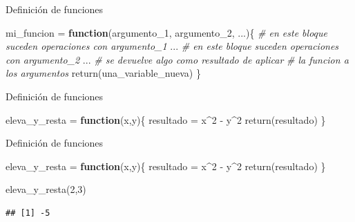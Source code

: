 \documentclass[
  ignorenonframetext,
]{beamer}
\newenvironment{Shaded}{\begin{snugshade}}{\end{snugshade}}
\newcommand{\CommentTok}[1]{\textcolor[rgb]{0.56,0.35,0.01}{\textit{#1}}}
\newcommand{\ControlFlowTok}[1]{\textcolor[rgb]{0.13,0.29,0.53}{\textbf{#1}}}
\newcommand{\DecValTok}[1]{\textcolor[rgb]{0.00,0.00,0.81}{#1}}
\newcommand{\FunctionTok}[1]{\textcolor[rgb]{0.00,0.00,0.00}{#1}}
\newcommand{\NormalTok}[1]{#1}
\newcommand{\OtherTok}[1]{\textcolor[rgb]{0.56,0.35,0.01}{#1}}
\newcommand{\SpecialCharTok}[1]{\textcolor[rgb]{0.00,0.00,0.00}{#1}}
\begin{document}
\begin{frame}[fragile]{Definición de funciones}
\protect\hypertarget{definiciuxf3n-de-funciones}{}
\begin{Shaded}
\begin{Highlighting}[]
\NormalTok{mi\_funcion }\OtherTok{=} \ControlFlowTok{function}\NormalTok{(argumento\_1, argumento\_2, ...)\{}
  \CommentTok{\# en este bloque suceden operaciones con argumento\_1}
\NormalTok{  ...}
  \CommentTok{\# en este bloque suceden operaciones con argumento\_2}
\NormalTok{  ...}
  \CommentTok{\# se devuelve algo como resultado de aplicar}
  \CommentTok{\# la funcion a los argumentos}
  \FunctionTok{return}\NormalTok{(una\_variable\_nueva)}
\NormalTok{\}}
\end{Highlighting}
\end{Shaded}
\end{frame}

\begin{frame}[fragile]{Definición de funciones}
\protect\hypertarget{definiciuxf3n-de-funciones-1}{}
\begin{Shaded}
\begin{Highlighting}[]
\NormalTok{eleva\_y\_resta }\OtherTok{=} \ControlFlowTok{function}\NormalTok{(x,y)\{}
\NormalTok{  resultado }\OtherTok{=}\NormalTok{ x}\SpecialCharTok{\^{}}\DecValTok{2} \SpecialCharTok{{-}}\NormalTok{ y}\SpecialCharTok{\^{}}\DecValTok{2}
  \FunctionTok{return}\NormalTok{(resultado)}
\NormalTok{\}}
\end{Highlighting}
\end{Shaded}
\end{frame}

\begin{frame}[fragile]{Definición de funciones}
\protect\hypertarget{definiciuxf3n-de-funciones-2}{}
\begin{Shaded}
\begin{Highlighting}[]
\NormalTok{eleva\_y\_resta }\OtherTok{=} \ControlFlowTok{function}\NormalTok{(x,y)\{}
\NormalTok{  resultado }\OtherTok{=}\NormalTok{ x}\SpecialCharTok{\^{}}\DecValTok{2} \SpecialCharTok{{-}}\NormalTok{ y}\SpecialCharTok{\^{}}\DecValTok{2}
  \FunctionTok{return}\NormalTok{(resultado)}
\NormalTok{\}}

\FunctionTok{eleva\_y\_resta}\NormalTok{(}\DecValTok{2}\NormalTok{,}\DecValTok{3}\NormalTok{)}
\end{Highlighting}
\end{Shaded}

\begin{verbatim}
## [1] -5
\end{verbatim}
\end{frame}
\end{document}
